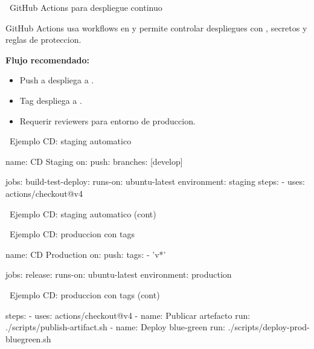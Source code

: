 \documentclass[aspectratio=169]{beamer}
\begin{document}
\begin{frame}{\faGithub\ GitHub Actions para despliegue continuo}
	\begin{orangebox}
		GitHub Actions usa workflows en  y permite controlar despliegues con , secretos y reglas de proteccion.
	\end{orangebox}

	\vspace{0.3cm}
	\textbf{Flujo recomendado:}
	\begin{itemize}
		\item Push a  despliega a .
		\item Tag  despliega a .
		\item Requerir reviewers para entorno de produccion.
	\end{itemize}
\end{frame}

\begin{frame}[fragile]{\faGithub\ Ejemplo CD: staging automatico}
\begin{yamlcodebox}
name: CD Staging
on:
  push:
	branches: [develop]

jobs:
  build-test-deploy:
	runs-on: ubuntu-latest
	environment: staging
	steps:
	  - uses: actions/checkout@v4
\end{yamlcodebox}
\end{frame}
\begin{frame}[fragile]{\faGithub\ Ejemplo CD: staging automatico (cont)}
\end{frame}

\begin{frame}[fragile]{\faGithub\ Ejemplo CD: produccion con tags}
\begin{yamlcodebox}
name: CD Production
on:
  push:
	tags:
	  - 'v*'

jobs:
  release:
	runs-on: ubuntu-latest
	environment: production
\end{yamlcodebox}
\end{frame}
\begin{frame}[fragile]{\faGithub\ Ejemplo CD: produccion con tags (cont)}
\begin{yamlcodebox}
	steps:
	  - uses: actions/checkout@v4
	  - name: Publicar artefacto
		run: ./scripts/publish-artifact.sh
	  - name: Deploy blue-green
		run: ./scripts/deploy-prod-bluegreen.sh
\end{yamlcodebox}
\end{frame}
\end{document}
